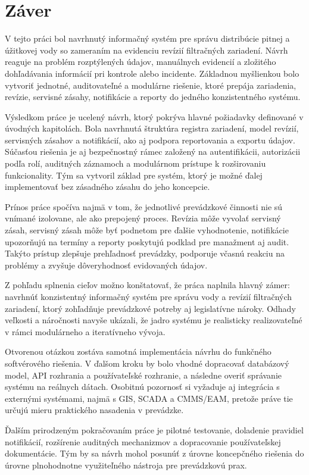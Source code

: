 
\chapter{Záver}\label{ch:summary}

V tejto práci bol navrhnutý informačný systém pre správu distribúcie pitnej a úžitkovej vody so zameraním na evidenciu revízií filtračných zariadení. Návrh reaguje na problém rozptýlených údajov, manuálnych evidencií a zložitého dohľadávania informácií pri kontrole alebo incidente. Základnou myšlienkou bolo vytvoriť jednotné, auditovateľné a modulárne riešenie, ktoré prepája zariadenia, revízie, servisné zásahy, notifikácie a reporty do jedného konzistentného systému.

Výsledkom práce je ucelený návrh, ktorý pokrýva hlavné požiadavky definované v úvodných kapitolách. Bola navrhnutá štruktúra registra zariadení, model revízií, servisných zásahov a notifikácií, ako aj podpora reportovania a exportu údajov. Súčasťou riešenia je aj bezpečnostný rámec založený na autentifikácii, autorizácii podľa rolí, auditných záznamoch a modulárnom prístupe k rozširovaniu funkcionality. Tým sa vytvoril základ pre systém, ktorý je možné ďalej implementovať bez zásadného zásahu do jeho koncepcie.

Prínos práce spočíva najmä v tom, že jednotlivé prevádzkové činnosti nie sú vnímané izolovane, ale ako prepojený proces. Revízia môže vyvolať servisný zásah, servisný zásah môže byť podnetom pre ďalšie vyhodnotenie, notifikácie upozorňujú na termíny a reporty poskytujú podklad pre manažment aj audit. Takýto prístup zlepšuje prehľadnosť prevádzky, podporuje včasnú reakciu na problémy a zvyšuje dôveryhodnosť evidovaných údajov.

Z pohľadu splnenia cieľov možno konštatovať, že práca naplnila hlavný zámer: navrhnúť konzistentný informačný systém pre správu vody a revízií filtračných zariadení, ktorý zohľadňuje prevádzkové potreby aj legislatívne nároky. Odhady veľkosti a náročnosti navyše ukázali, že jadro systému je realisticky realizovateľné v rámci modulárneho a iteratívneho vývoja.

Otvorenou otázkou zostáva samotná implementácia návrhu do funkčného softvérového riešenia. V ďalšom kroku by bolo vhodné dopracovať databázový model, API rozhrania a používateľské rozhranie, a následne overiť správanie systému na reálnych dátach. Osobitnú pozornosť si vyžaduje aj integrácia s externými systémami, najmä s GIS, SCADA a CMMS/EAM, pretože práve tie určujú mieru praktického nasadenia v prevádzke.

Ďalším prirodzeným pokračovaním práce je pilotné testovanie, doladenie pravidiel notifikácií, rozšírenie auditných mechanizmov a dopracovanie používateľskej dokumentácie. Tým by sa návrh mohol posunúť z úrovne koncepčného riešenia do úrovne plnohodnotne využiteľného nástroja pre prevádzkovú prax.
